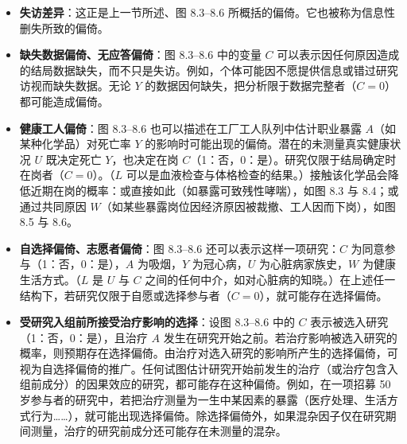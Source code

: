 \begin{itemize}
\item \textbf{失访差异}：这正是上一节所述、图 8.3–8.6 所概括的偏倚。它也被称为信息性删失所致的偏倚。
\item \textbf{缺失数据偏倚、无应答偏倚}：图 8.3–8.6 中的变量 $C$ 可以表示因任何原因造成的结局数据缺失，而不只是失访。例如，个体可能因不愿提供信息或错过研究访视而缺失数据。无论 $Y$ 的数据因何缺失，把分析限于数据完整者（$C=0$）都可能造成偏倚。
\item \textbf{健康工人偏倚}：图 8.3–8.6 也可以描述在工厂工人队列中估计职业暴露 $A$（如某种化学品）对死亡率 $Y$ 的影响时可能出现的偏倚。潜在的未测量真实健康状况 $U$ 既决定死亡 $Y$，也决定在岗 $C$（1：否，0：是）。研究仅限于结局确定时在岗者（$C=0$）。（$L$ 可以是血液检查与体格检查的结果。）接触该化学品会降低近期在岗的概率：或直接如此（如暴露可致残性哮喘），如图 8.3 与 8.4；或通过共同原因 $W$（如某些暴露岗位因经济原因被裁撤、工人因而下岗），如图 8.5 与 8.6。
\item \textbf{自选择偏倚、志愿者偏倚}：图 8.3–8.6 还可以表示这样一项研究：$C$ 为同意参与（1：否，0：是），$A$ 为吸烟，$Y$ 为冠心病，$U$ 为心脏病家族史，$W$ 为健康生活方式。（$L$ 是 $U$ 与 $C$ 之间的任何中介，如对心脏病的知晓。）在上述任一结构下，若研究仅限于自愿或选择参与者（$C=0$），就可能存在选择偏倚。
\item \textbf{受研究入组前所接受治疗影响的选择}：设图 8.3–8.6 中的 $C$ 表示被选入研究（1：否，0：是），且治疗 $A$ 发生在研究开始之前。若治疗影响被选入研究的概率，则预期存在选择偏倚。由治疗对选入研究的影响所产生的选择偏倚，可视为自选择偏倚的推广。任何试图估计研究开始前发生的治疗（或治疗包含入组前成分）的因果效应的研究，都可能存在这种偏倚。例如，在一项招募 50 岁参与者的研究中，若把治疗测量为一生中某因素的暴露（医疗处理、生活方式行为……），就可能出现选择偏倚。除选择偏倚外，如果混杂因子仅在研究期间测量，治疗的研究前成分还可能存在未测量的混杂。
\end{itemize}

